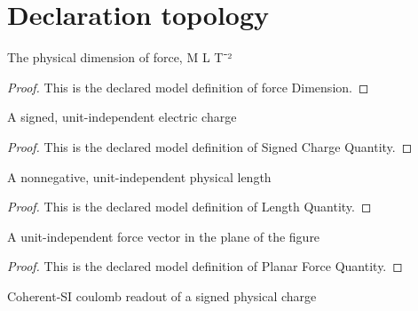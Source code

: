 \section{Declaration topology}
\begin{definition}
  \label{def:physics:phyx-mini-0896:phyxminiproblems-problemphyxmini0896-forcedimension}
  The physical dimension of force, M L T⁻²
\end{definition}
\begin{proof}
  This is the declared model definition of force Dimension.
\end{proof}
\begin{definition}
  \label{def:physics:phyx-mini-0896:phyxminiproblems-problemphyxmini0896-signedchargequantity}
  A signed, unit-independent electric charge
\end{definition}
\begin{proof}
  This is the declared model definition of Signed Charge Quantity.
\end{proof}
\begin{definition}
  \label{def:physics:phyx-mini-0896:phyxminiproblems-problemphyxmini0896-lengthquantity}
  A nonnegative, unit-independent physical length
\end{definition}
\begin{proof}
  This is the declared model definition of Length Quantity.
\end{proof}
\begin{definition}
  \label{def:physics:phyx-mini-0896:phyxminiproblems-problemphyxmini0896-planarforcequantity}
  A unit-independent force vector in the plane of the figure
\end{definition}
\begin{proof}
  This is the declared model definition of Planar Force Quantity.
\end{proof}
\begin{definition}
  \label{def:physics:phyx-mini-0896:phyxminiproblems-problemphyxmini0896-chargeincoulombs}
  Coherent-SI coulomb readout of a signed physical charge
\end{definition}
